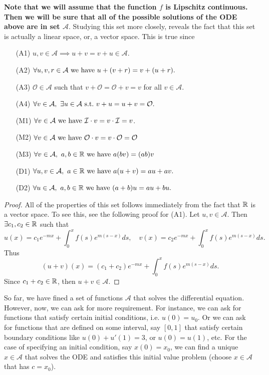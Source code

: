 \textbf{Note that we will assume that the function $f$ is Lipschitz continuous. Then we will be sure that all of the possible solutions of the ODE above are in set $\mathcal{A}$}. Studying this set more closely, reveals the fact that this set is actually a linear space, or, a vector space. This is true since
\begin{enumerate}
	\setlength\itemsep{0em}
	\item [(A1)] $u,v\in \mathcal{A} \implies u+v = v+u \in \mathcal{A}$.
	\item [(A2)] $\forall u,v,r \in \mathcal{A} \ \text{we have}\  u+(v+r) = v+(u+r).$
	\item [(A3)] $\mathcal{O} \in \mathcal{A}$ such that $v+\mathcal{O} = \mathcal{O} + v = v$ for all $v\in \mathcal{A}$.
	\item [(A4)] $\forall v\in \mathcal{A},\ \exists u \in \mathcal{A} \ \text{s.t.}\  v + u = u + v = \mathcal{O}.$	
	\item []
	\item [(M1)] $\forall v \in \mathcal{A} \ \text{we have}\  \mathcal{I}\cdot v = v\cdot \mathcal{I} = v$.
	\item [(M2)] $\forall v \in \mathcal{A} \ \text{we have}\  \mathcal{O}\cdot v = v\cdot \mathcal{O} = \mathcal{O}$
	\item [(M3)] $\forall v\in \mathcal{A},\ a,b \in \mathbb{R} \ \text{we have}\  a(bv) = (ab)v$ 
	\item []
	\item [(D1)] $\forall u,v\in \mathcal{A},\ a\in \mathbb{R} \ \text{we have}\  a(u+v) = au + av.$
	\item [(D2)] $\forall u \in \mathcal{A},\ a,b\in \mathbb{R} \ \text{we have}\  (a+b)u = au + bu. $
\end{enumerate}
\begin{proof}
	All of the properties of this set follows immediately from the fact that $\mathbb{R}$ is a vector space. To see this, see the following proof for (A1).
	Let $u,v \in \mathcal{A}$. Then $\exists c_1, c_2 \in \mathbb{R}$ such that 
	\[ u(x) = c_1e^{-mx} + \int_{0}^{x}f(s)e^{m(s-x)}ds, \quad v(x) = c_2e^{-mx} + \int_{0}^{x}f(s)e^{m(s-x)}ds. \]
	Thus 
	\[ (u+v)(x) = (c_1+c_2)e^{-mx} + \int_{0}^{x}f(s)e^{m(s-x)}ds. \]
	Since $c_1 + c_2 \in \mathbb{R}$, then $u+v \in \mathcal{A}$.
\end{proof}

So far, we have fined a set of functions $\mathcal{A}$ that solves the differential equation. However, now, we can ask for more requirement. For instance, we can ask for functions that satisfy certain initial conditions, i.e. $u(0) = u_0$. Or we can ask for functions that are defined on some interval, say $[0,1]$ that satisfy certain boundary conditions like $u(0) + u'(1) = 3$, or $u(0) = u(1)$, etc. For the case of specifying an initial condition, say $x(0) = x_0$, we can find a unique $x\in \mathcal{A}$ that solves the ODE and satisfies this initial value problem (choose $x\in \mathcal{A}$ that has $c= x_0$).


